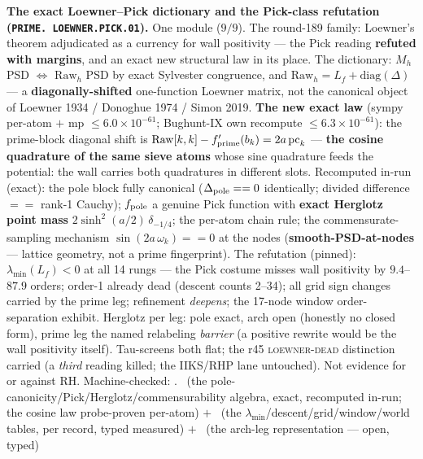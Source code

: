 \documentclass[11pt,a4paper]{article}
\theoremstyle{definition}
\begin{document}
\par\smallskip\noindent\textbf{The exact Loewner--Pick dictionary
and the Pick-class refutation (\texttt{PRIME.\allowbreak
LOEWNER.\allowbreak PICK.01}).}
One module ($9/9$).  The round-189 family: Loewner's theorem
adjudicated as a currency for wall positivity --- the Pick
reading \textbf{refuted with margins}, and an exact new
structural law in its place.  The dictionary: $M_h$ PSD
$\Leftrightarrow$ $\mathrm{Raw}_h$ PSD by exact Sylvester
congruence, and $\mathrm{Raw}_h = L_f + \mathrm{diag}(\Delta)$
--- a \textbf{diagonally-shifted} one-function Loewner matrix,
not the canonical object of Loewner 1934 / Donoghue 1974 / Simon
2019.  \textbf{The new exact law} (sympy per-atom $+$ mp $\le
6.0\times10^{-61}$; Bughunt-IX own recompute $\le
6.3\times10^{-61}$): the prime-block diagonal shift is
$\mathrm{Raw}[k,k] - f_{\rm prime}'(b_k) = 2a\,\mathrm{pc}_k$ ---
\textbf{the cosine quadrature of the same sieve atoms} whose sine
quadrature feeds the potential: the wall carries both quadratures
in different slots.  Recomputed in-run (exact): the pole block
fully canonical ($\Delta_{\rm pole} == 0$ identically; divided
difference $==$ rank-1 Cauchy); $f_{\rm pole}$ a genuine Pick
function with \textbf{exact Herglotz point mass}
$2\sinh^2(a/2)\,\delta_{-1/4}$; the per-atom chain rule; the
commensurate-sampling mechanism $\sin(2a\,\omega_k) == 0$ at the
nodes (\textbf{smooth-PSD-at-nodes} --- lattice geometry, not a
prime fingerprint).  The refutation (pinned):
$\lambda_{\min}(L_f) < 0$ at all 14 rungs --- the Pick costume
misses wall positivity by $9.4$--$87.9$ orders; order-1 already
dead (descent counts 2--34); all grid sign changes carried by the
prime leg; refinement \emph{deepens}; the 17-node window
order-separation exhibit.  Herglotz per leg: pole exact, arch
open (honestly no closed form), prime leg the named relabeling
\emph{barrier} (a positive rewrite would be the wall positivity
itself).  Tau-screens both flat; the r45 \textsc{loewner-dead}
distinction carried (a \emph{third} reading killed; the IIKS/RHP
lane untouched).  Not evidence for or against RH.
Machine-checked: .
\mE\ (the pole-canonicity/Pick/Herglotz/commensurability algebra,
exact, recomputed in-run; the cosine law probe-proven per-atom)
$+$ \mC\ (the $\lambda_{\min}$/descent/grid/window/world tables,
per record, typed measured) $+$ \mO\ (the arch-leg representation
--- open, typed)
\par\smallskip
\end{document}
